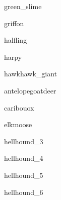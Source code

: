 \documentclass[a4paper,serif]{module}
\begin{document}
\begin{newmonster}{green_slime}\end{newmonster}

\begin{newmonster}{griffon}\end{newmonster}

\begin{newmonster}{halfling}\end{newmonster}

\begin{newmonster}{harpy}\end{newmonster}


\begin{newmonster2}{hawk}{hawk_giant}
\lipsum[1]
\end{newmonster2}


\begin{newmonster3}{antelope}{goat}{deer}\end{newmonster3}
\begin{newmonster2*}{caribou}{ox}{}{}\end{newmonster2*}
\begin{newmonster2*}{elk}{moose}{}{}
\lipsum[1]
\end{newmonster2*}


\begin{newmonster}{hellhound_3}\end{newmonster}

\begin{newmonster}{hellhound_4}\end{newmonster}

\begin{newmonster}{hellhound_5}\end{newmonster}

\begin{newmonster}{hellhound_6}\end{newmonster}
\end{document}
